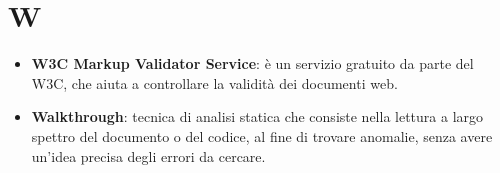 \section{W}
\begin{itemize}
	\item
	\textbf{W3C Markup Validator Service}:  è un servizio gratuito da parte del W3C, che aiuta a controllare la validità dei documenti web.
	\item
	\textbf{Walkthrough}: tecnica di analisi statica che consiste nella lettura a largo spettro del documento o del codice, al fine di trovare anomalie, senza avere un'idea precisa degli errori da cercare.
\end{itemize}